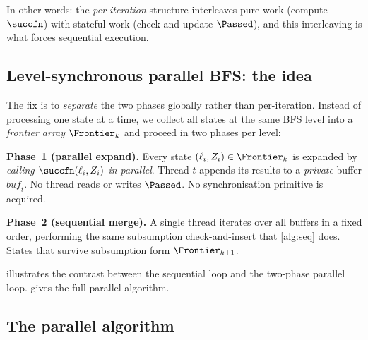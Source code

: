 In other words: the \emph{per-iteration} structure interleaves pure work
(compute $\succfn$) with stateful work (check and update $\Passed$), and this
interleaving is what forces sequential execution.

\subsection{Level-synchronous parallel BFS: the idea}

The fix is to \emph{separate} the two phases globally rather than
per-iteration.  Instead of processing one state at a time, we collect all
states at the same BFS level into a \emph{frontier array} $\Frontier_k$ and
proceed in two phases per level:

\medskip
\noindent\textbf{Phase~1 (parallel expand).}
Every state $(\ell_i, Z_i) \in \Frontier_k$ is expanded by
\emph{calling $\succfn(\ell_i, Z_i)$ in parallel}.  Thread $t$ appends its
results to a \emph{private} buffer $\mathit{buf}_t$.  No thread reads or
writes $\Passed$.  No synchronisation primitive is acquired.

\medskip
\noindent\textbf{Phase~2 (sequential merge).}
A single thread iterates over all buffers in a fixed order, performing the
same subsumption check-and-insert that \cref{alg:seq} does.  States that
survive subsumption form $\Frontier_{k+1}$.

\medskip
\noindent
{} illustrates the contrast between the sequential loop
and the two-phase parallel loop.   gives the full parallel
algorithm.

\subsection{The parallel algorithm}

